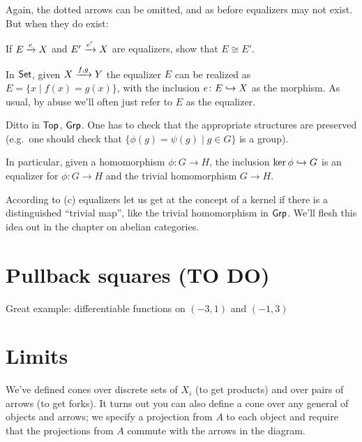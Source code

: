 Again, the dotted arrows can be omitted, and as before equalizers may not exist.
But when they do exist:
\begin{exercise}
	If $E \xrightarrow{e} X$ and $E' \xrightarrow{e'} X$ are equalizers,
	show that $E \cong E'$.
\end{exercise}

\begin{example}
	\listhack
	\begin{enumerate}[(a)]
		\ii In $\mathsf{Set}$, given $X \xrightarrow{f,g} Y$
		the equalizer $E$ can be realized as $E = \{x \mid f(x) = g(x)\}$,
		with the inclusion $e \colon E \hookrightarrow X$ as the morphism.
		As usual, by abuse we'll often just refer to $E$ as the equalizer.

		\ii Ditto in $\mathsf{Top}$, $\mathsf{Grp}$.
		One has to check that the appropriate structures are preserved
		(e.g.\ one should check that $\{\phi(g) = \psi(g) \mid g \in G\}$ is a group).

		\ii In particular, given a homomorphism $\phi \colon G \to H$, the inclusion
		$ \ker\phi \hookrightarrow G $
		is an equalizer for $\phi \colon G \to H$ and the trivial homomorphism $G \to H$.
	\end{enumerate}
\end{example}

According to (c) equalizers let us get at the concept of a kernel
if there is a distinguished
``trivial map'', like the trivial homomorphism in $\mathsf{Grp}$.
We'll flesh this idea out in the chapter on abelian categories.

\section{Pullback squares (TO DO)}
Great example: differentiable functions on $(-3,1)$ and $(-1,3)$

\begin{example}
	\label{ex:diff_pullback}
\end{example}

\section{Limits}
We've defined cones over discrete sets of $X_i$ (to get products)
and over pairs of arrows (to get forks).
It turns out you can also define a cone over any general  of objects and arrows;
we specify a projection from $A$ to each object and
require that the projections from $A$ commute with the arrows in the diagram.

